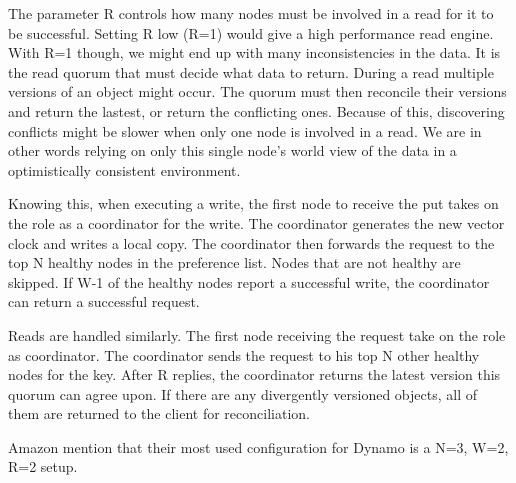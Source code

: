 The parameter R controls how many nodes must be involved in a read for it to be successful. Setting R low (R=1) would give a high performance read engine. With R=1 though, we might end up with many inconsistencies in the data. It is the read quorum that must decide what data to return. During a read multiple versions of an object might occur. The quorum must then reconcile their versions and return the lastest, or return the conflicting ones.
Because of this, discovering conflicts might be slower when only one node is involved in a read. We are in other words relying on only this single node's world view of the data in a optimistically consistent environment.

Knowing this, when executing a write, the first node to receive the put takes on the role as a coordinator for the write. The coordinator generates the new vector clock and writes a local copy. The coordinator then forwards the request to the top N healthy nodes in the preference list. Nodes that are not healthy are skipped. If W-1 of the healthy nodes report a successful write, the coordinator can return a successful request. 

Reads are handled similarly. The first node receiving the request take on the role as coordinator. The coordinator sends the request to his top N other healthy nodes for the key. After R replies, the coordinator returns the latest version this quorum can agree upon. If there are any divergently versioned objects, all of them are returned to the client for reconciliation.

Amazon\cite{dynamo} mention that their most used configuration for Dynamo is a N=3, W=2, R=2 setup.


